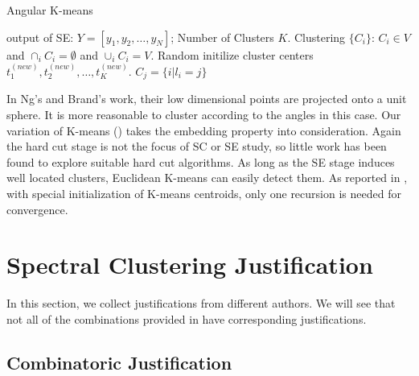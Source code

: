 \begin{algorithm}[htb]
	\caption{Angular K-means}
	\label{alg:sc_akm}
	\begin{algorithmic}[1]
		\REQUIRE output of SE: $Y = [y_1, y_2, \ldots, y_N]$;  
		Number of Clusters $K$. 
		\ENSURE Clustering $\{C_i\}$: $C_i \in V$ 
			and $\cap_i C_i = \emptyset$
			and $\cup_i C_i = V$. 
		\STATE Random initilize cluster centers $t^{(new)}_1, t^{(new)}_2, \dots, t^{(new)}_K$.
		\STATE $C_j = \{i| l_i = j\}$
	\end{algorithmic}
\end{algorithm}

In Ng's \cite{ng2002spectral} and Brand's \cite{brand2003unifying} work, 
their low dimensional points are projected onto a unit sphere. It is more 
reasonable to cluster according to the angles
in this case. Our variation of K-means
(\ralg{\ref{alg:sc_akm}}) takes the embedding property into consideration. 
Again the hard cut stage is not the focus of SC or SE study, so 
little work has been found to explore suitable hard cut algorithms. 
As long as the SE stage induces well located clusters, Euclidean 
K-means can easily detect them. As reported in \cite{ng2002spectral}, 
with special initialization of K-means centroids, only one recursion 
is needed for convergence. 

\section{Spectral Clustering Justification}
\label{sec:justification}

In this section, we collect justifications from different authors. 
We will see that not all of the combinations provided in 
\rsec{\ref{sec:framework}} have corresponding justifications. 

\subsection{Combinatoric Justification}
\label{sec:combinatoric}


